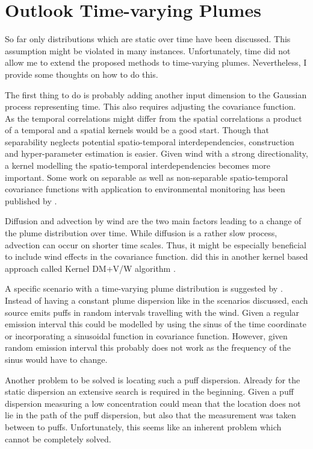 \chapter{Outlook Time-varying Plumes}\label{sec:timevarying}
So far only distributions which are static over time have been discussed. This 
assumption might be violated in many instances. Unfortunately, time did not 
allow me to extend the proposed methods to time-varying plumes. Nevertheless, 
I provide some thoughts on how to do this.

The first thing to do is probably adding another input dimension to the Gaussian 
process representing time. This also requires adjusting the covariance function.  
As the temporal correlations might differ from the spatial correlations 
a product of a temporal and a spatial kernels would be a good start. Though that 
separability neglects potential spatio-temporal interdependencies, construction 
and hyper-parameter estimation is easier. Given wind with a strong 
directionality, a kernel modelling the spatio-temporal interdependencies becomes 
more important. Some work on separable as well as non-separable spatio-temporal 
covariance functions with application to environmental monitoring has been 
published by \textcite{Singh:2010wt}.

Diffusion and advection by wind are the two main factors leading to a change of 
the plume distribution over time. While diffusion is a rather slow process, 
advection can occur on shorter time scales. Thus, it might be especially 
beneficial to include wind effects in the covariance function.  
\Textcite{Reggente:2009ti} did this in another kernel based approach called 
Kernel DM+V/W algorithm \parencite{Lilienthal:2009ij}.

A specific scenario with a time-varying plume distribution is suggested by 
\textcite{denardi2013rn}. Instead of having a constant plume dispersion like in 
the scenarios discussed, each source emits puffs in random intervals travelling 
with the wind.  Given a regular emission interval this could be modelled by 
using the sinus of the time coordinate or incorporating a sinusoidal function in 
covariance function.  However, given random emission interval this probably does 
not work as the frequency of the sinus would have to change.

Another problem to be solved is locating such a puff dispersion. Already for the 
static dispersion an extensive search is required in the beginning. Given a puff 
dispersion measuring a low concentration could mean that the location does not 
lie in the path of the puff dispersion, but also that the measurement was taken 
between to puffs. Unfortunately, this seems like an inherent problem which 
cannot be completely solved.

